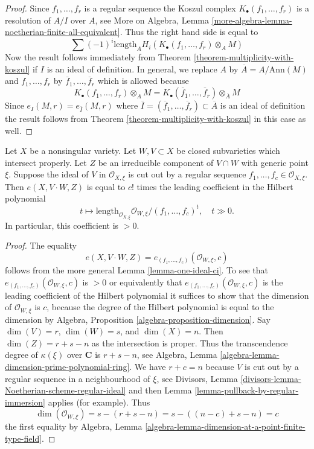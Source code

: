 \begin{proof}
Since $f_1, \ldots, f_r$ is a regular sequence the Koszul complex
$K_\bullet(f_1, \ldots, f_r)$ is a resolution of $A/I$ over $A$, see
More on Algebra, Lemma
\ref{more-algebra-lemma-noetherian-finite-all-equivalent}.
Thus the right hand side is equal to
$$
\sum (-1)^i\text{length}_A H_i(K_\bullet(f_1, \ldots, f_r) \otimes_A M)
$$
Now the result follows immediately from
Theorem \ref{theorem-multiplicity-with-koszul} if $I$ is an ideal
of definition. In general, we replace $A$ by $\overline{A} = A/\text{Ann}(M)$
and $f_1, \ldots, f_r$ by $\overline{f}_1, \ldots, \overline{f}_r$
which is allowed because
$$
K_\bullet(f_1, \ldots, f_r) \otimes_A M =
K_\bullet(\overline{f}_1, \ldots, \overline{f}_r) \otimes_{\overline{A}} M
$$
Since $e_I(M, r) = e_{\overline{I}}(M, r)$ where
$\overline{I} = (\overline{f}_1, \ldots, \overline{f}_r) \subset \overline{A}$
is an ideal of definition the result follows from
Theorem \ref{theorem-multiplicity-with-koszul} in this case as well.
\end{proof}

\begin{lemma}
\label{lemma-multiplicity-with-lci}
Let $X$ be a nonsingular variety. Let $W,V \subset X$ be
closed subvarieties which intersect properly. Let $Z$ be an irreducible
component of $V \cap W$ with generic point $\xi$.
Suppose the ideal of $V$ in $\mathcal{O}_{X, \xi}$ is cut out by
a regular sequence $f_1, \ldots, f_c \in \mathcal{O}_{X, \xi}$.
Then $e(X, V\cdot W, Z)$ is equal to $c!$ times the leading coefficient in
the Hilbert polynomial
$$
t \mapsto \text{length}_{\mathcal{O}_{X, \xi}}
\mathcal{O}_{W, \xi}/(f_1, \ldots, f_c)^t,\quad t \gg 0.
$$
In particular, this coefficient is $> 0$.
\end{lemma}

\begin{proof}
The equality
$$
e(X, V\cdot W, Z) = e_{(f_1, \ldots, f_c)}(\mathcal{O}_{W, \xi}, c)
$$
follows from the more general Lemma \ref{lemma-one-ideal-ci}.
To see that $e_{(f_1, \ldots, f_c)}(\mathcal{O}_{W, \xi}, c)$ is
$> 0$ or equivalently that $e_{(f_1, \ldots, f_c)}(\mathcal{O}_{W, \xi}, c)$
is the leading coefficient of the Hilbert polynomial
it suffices to show that the
dimension of $\mathcal{O}_{W, \xi}$ is $c$, because the degree of the
Hilbert polynomial is equal to the dimension by
Algebra, Proposition \ref{algebra-proposition-dimension}.
Say $\dim(V) = r$, $\dim(W) = s$, and $\dim(X) = n$. Then
$\dim(Z) = r + s - n$ as the intersection is proper. Thus
the transcendence degree of $\kappa(\xi)$ over $\mathbf{C}$ is
$r + s - n$, see Algebra, Lemma
\ref{algebra-lemma-dimension-prime-polynomial-ring}.
We have $r + c = n$ because $V$ is cut out by a regular sequence
in a neighbourhood of $\xi$, see
Divisors, Lemma \ref{divisors-lemma-Noetherian-scheme-regular-ideal}
and then Lemma \ref{lemma-pullback-by-regular-immersion}
applies (for example). Thus
$$
\dim(\mathcal{O}_{W, \xi}) = s - (r + s - n) = s - ((n - c) + s - n) = c
$$
the first equality by Algebra, Lemma
\ref{algebra-lemma-dimension-at-a-point-finite-type-field}.
\end{proof}

